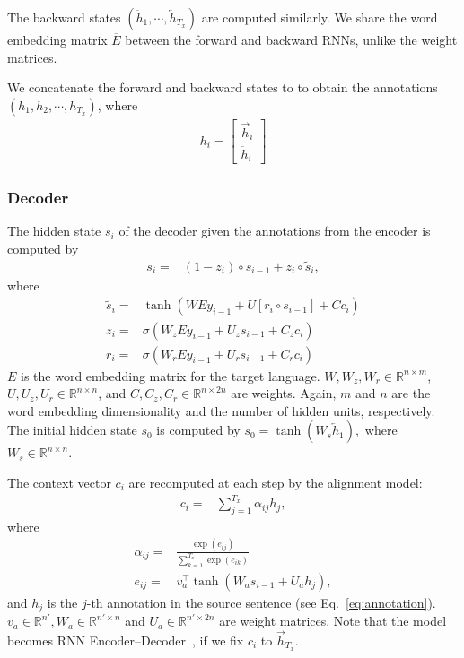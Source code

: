 \documentclass{article} %
\newcommand{\RR}[0]{\mathbb{R}}
\newcommand{\ola}{\overleftarrow}
\newcommand{\ora}{\overrightarrow}
\newcommand{\ov}{\overline}
\begin{document}
The backward states $(\ola{h}_1, \cdots, \ola{h}_{T_x})$ are computed similarly.
We share the word embedding matrix $\ov{E}$ between the forward and backward
RNNs, unlike the weight matrices.

We concatenate the forward and backward states to to obtain the annotations
$(h_1, h_2, \cdots, h_{T_x})$, where
\begin{align}
    \label{eq:annotation}
    h_i = \left[ 
        \begin{array}{c}
    \ora{h}_i \\
    \ola{h}_i 
\end{array}
\right]
    \end{align}

\subsubsection{Decoder}

The hidden state $s_i$ of the decoder given the annotations from the encoder is
computed by
\begin{align*}
    s_i =& (1 - z_i) \circ s_{i-1} + z_i \circ \tilde{s}_i,
\end{align*}
where
\begin{align*}
    \tilde{s}_{i} =& \tanh \left( W E y_{i - 1} + U \left[ r_i \circ s_{i - 1} \right] +
    C c_i \right) \\ 
    z_i =& \sigma\left( W_z E y_{i - 1} + U_z s_{i-1} 
    + C_z c_i \right)\\
    r_i =& \sigma\left( W_r E y_{i - 1} + U_r s_{i-1}
    + C_r c_i \right)
\end{align*}
$E$ is the word embedding matrix for the target language.
$W, W_z, W_r \in \mathbb{R}^{n\times m}$, 
$U, U_z, U_r \in \mathbb{R}^{n\times n}$, and
$C, C_z, C_r \in \mathbb{R}^{n\times 2n}$ are weights. Again, $m$ and $n$ are the word
embedding dimensionality and the number of hidden units, respectively.
The initial hidden state $s_0$ is computed by 
$
    s_{0} = \tanh\left( W_s \ola{h}_1 \right),
$
where $W_s \in \RR^{n \times n}$.

The context vector $c_i$ are recomputed at each step by the alignment model:
\begin{align*}
    c_i =& \sum_{j=1}^{T_x} \alpha_{ij} h_j,
\end{align*}
where
\begin{align*}
    \alpha_{ij} =& \frac{\exp\left(e_{ij}\right)}{\sum_{k=1}^{T_x}
    \exp\left(e_{ik}\right)}  \\
    e_{ij} =& v_a^{\top} \tanh\left( W_a s_{i-1} + U_a h_j \right),
\end{align*}
and $h_j$ is the $j$-th annotation in the source sentence (see
Eq.~\eqref{eq:annotation}).  $v_a \in \mathbb{R}^{n'}, W_a \in
\mathbb{R}^{n'\times n}$ and $U_a \in \mathbb{R}^{n'\times  2n}$ are weight
matrices.  Note that the model becomes
RNN Encoder--Decoder~\citep{Cho2014}, if we fix $c_i$ to $\ora{h}_{T_x}$.
\end{document}
